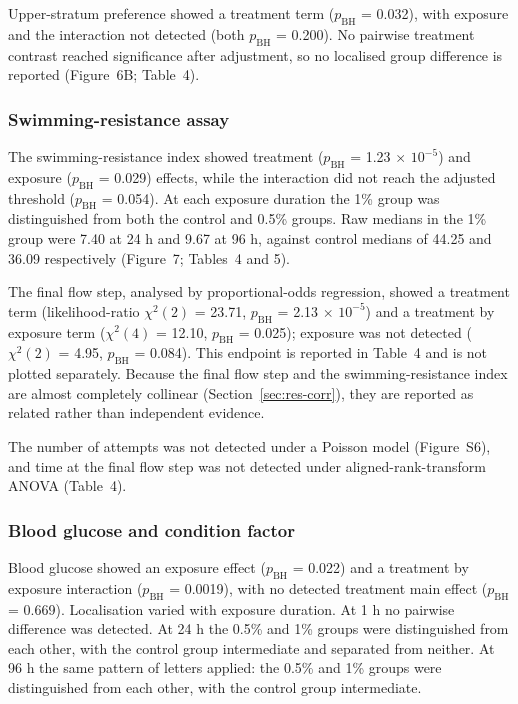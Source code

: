 \documentclass[12pt,a4paper]{article}
\begin{document}
Upper-stratum preference showed a treatment term ($p_{\mathrm{BH}}$ = 0.032), with exposure and the interaction not detected (both $p_{\mathrm{BH}}$ = 0.200). No pairwise treatment contrast reached significance after adjustment, so no localised group difference is reported (Figure~6B; Table~4).

\subsubsection{Swimming-resistance assay}
\label{sec-3-4-4}

The swimming-resistance index showed treatment ($p_{\mathrm{BH}}$ = 1.23 $\times$ $10^{-5}$) and exposure ($p_{\mathrm{BH}}$ = 0.029) effects, while the interaction did not reach the adjusted threshold ($p_{\mathrm{BH}}$ = 0.054). At each exposure duration the 1\% group was distinguished from both the control and 0.5\% groups. Raw medians in the 1\% group were 7.40 at 24 h and 9.67 at 96 h, against control medians of 44.25 and 36.09 respectively (Figure~7; Tables~4 and 5).

The final flow step, analysed by proportional-odds regression, showed a treatment term (likelihood-ratio $\chi^{2}(2)$ = 23.71, $p_{\mathrm{BH}}$ = 2.13 $\times$ $10^{-5}$) and a treatment by exposure term ($\chi^{2}(4)$ = 12.10, $p_{\mathrm{BH}}$ = 0.025); exposure was not detected ($\chi^{2}(2)$ = 4.95, $p_{\mathrm{BH}}$ = 0.084). This endpoint is reported in Table~4 and is not plotted separately. Because the final flow step and the swimming-resistance index are almost completely collinear (Section~\ref{sec:res-corr}), they are reported as related rather than independent evidence.

The number of attempts was not detected under a Poisson model (Figure~S6), and time at the final flow step was not detected under aligned-rank-transform ANOVA (Table~4).

\subsubsection{Blood glucose and condition factor}
\label{sec-3-4-5}

Blood glucose showed an exposure effect ($p_{\mathrm{BH}}$ = 0.022) and a treatment by exposure interaction ($p_{\mathrm{BH}}$ = 0.0019), with no detected treatment main effect ($p_{\mathrm{BH}}$ = 0.669). Localisation varied with exposure duration. At 1 h no pairwise difference was detected. At 24 h the 0.5\% and 1\% groups were distinguished from each other, with the control group intermediate and separated from neither. At 96 h the same pattern of letters applied: the 0.5\% and 1\% groups were distinguished from each other, with the control group intermediate.
\end{document}
